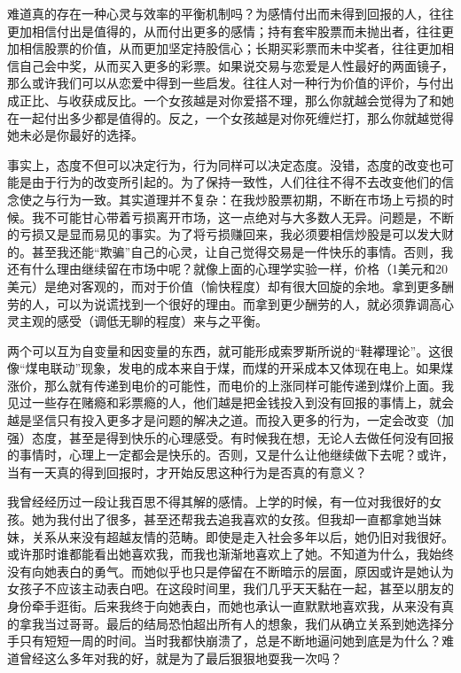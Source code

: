 难道真的存在一种心灵与效率的平衡机制吗？为感情付出而未得到回报的人，往往更加相信付出是值得的，从而付出更多的感情；持有套牢股票而未抛出者，往往更加相信股票的价值，从而更加坚定持股信心；长期买彩票而未中奖者，往往更加相信自己会中奖，从而买入更多的彩票。如果说交易与恋爱是人性最好的两面镜子，那么或许我们可以从恋爱中得到一些启发。往往人对一种行为价值的评价，与付出成正比、与收获成反比。一个女孩越是对你爱搭不理，那么你就越会觉得为了和她在一起付出多少都是值得的。反之，一个女孩越是对你死缠烂打，那么你就越觉得她未必是你最好的选择。

事实上，态度不但可以决定行为，行为同样可以决定态度。没错，态度的改变也可能是由于行为的改变所引起的。为了保持一致性，人们往往不得不去改变他们的信念使之与行为一致。其实道理并不复杂：在我炒股票初期，不断在市场上亏损的时候。我不可能甘心带着亏损离开市场，这一点绝对与大多数人无异。问题是，不断的亏损又是显而易见的事实。为了将亏损赚回来，我必须要相信炒股是可以发大财的。甚至我还能“欺骗”自己的心灵，让自己觉得交易是一件快乐的事情。否则，我还有什么理由继续留在市场中呢？就像上面的心理学实验一样，价格（1美元和20美元）是绝对客观的，而对于价值（愉快程度）却有很大回旋的余地。拿到更多酬劳的人，可以为说谎找到一个很好的理由。而拿到更少酬劳的人，就必须靠调高心灵主观的感受（调低无聊的程度）来与之平衡。

两个可以互为自变量和因变量的东西，就可能形成索罗斯所说的“鞋襻理论”。这很像“煤电联动”现象，发电的成本来自于煤，而煤的开采成本又体现在电上。如果煤涨价，那么就有传递到电价的可能性，而电价的上涨同样可能传递到煤价上面。我见过一些存在赌瘾和彩票瘾的人，他们越是把金钱投入到没有回报的事情上，就会越是坚信只有投入更多才是问题的解决之道。而投入更多的行为，一定会改变（加强）态度，甚至是得到快乐的心理感受。有时候我在想，无论人去做任何没有回报的事情时，心理上一定都会是快乐的。否则，又是什么让他继续做下去呢？或许，当有一天真的得到回报时，才开始反思这种行为是否真的有意义？

我曾经经历过一段让我百思不得其解的感情。上学的时候，有一位对我很好的女孩。她为我付出了很多，甚至还帮我去追我喜欢的女孩。但我却一直都拿她当妹妹，关系从来没有超越友情的范畴。即使是走入社会多年以后，她仍旧对我很好。或许那时谁都能看出她喜欢我，而我也渐渐地喜欢上了她。不知道为什么，我始终没有向她表白的勇气。而她似乎也只是停留在不断暗示的层面，原因或许是她认为女孩子不应该主动表白吧。在这段时间里，我们几乎天天黏在一起，甚至以朋友的身份牵手逛街。后来我终于向她表白，而她也承认一直默默地喜欢我，从来没有真的拿我当过哥哥。最后的结局恐怕超出所有人的想象，我们从确立关系到她选择分手只有短短一周的时间。当时我都快崩溃了，总是不断地逼问她到底是为什么？难道曾经这么多年对我的好，就是为了最后狠狠地耍我一次吗？

